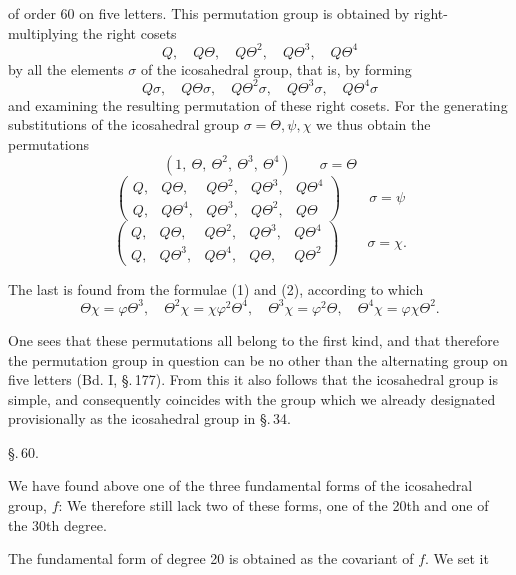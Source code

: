 of order 60 on five letters. This permutation group is obtained by right-multiplying the right cosets
\[
Q, \quad Q\Theta, \quad Q\Theta^2, \quad Q\Theta^3, \quad Q\Theta^4
\]
by all the elements $\sigma$ of the icosahedral group, that is, by forming
\[
Q\sigma, \quad Q\Theta\sigma, \quad Q\Theta^2\sigma, \quad Q\Theta^3\sigma, \quad Q\Theta^4\sigma
\]
and examining the resulting permutation of these right cosets. For the generating substitutions of the icosahedral group $\sigma = \Theta, \psi, \chi$ we thus obtain the permutations
\[
(1, \ \Theta, \ \Theta^2, \ \Theta^3, \ \Theta^4) \qquad \sigma = \Theta
\]
\[
\begin{pmatrix} Q, & Q\Theta, & Q\Theta^2, & Q\Theta^3, & Q\Theta^4 \\ Q, & Q\Theta^4, & Q\Theta^3, & Q\Theta^2, & Q\Theta \end{pmatrix} \qquad \sigma = \psi
\]
\[
\begin{pmatrix} Q, & Q\Theta, & Q\Theta^2, & Q\Theta^3, & Q\Theta^4 \\ Q, & Q\Theta^3, & Q\Theta^4, & Q\Theta, & Q\Theta^2 \end{pmatrix} \qquad \sigma = \chi.
\]

The last is found from the formulae (1) and (2), according to which
\[
\Theta\chi = \varphi\Theta^3, \quad \Theta^2\chi = \chi\varphi^2\Theta^4, \quad \Theta^3\chi = \varphi^2\Theta, \quad \Theta^4\chi = \varphi\chi\Theta^2.
\]

One sees that these permutations all belong to the first kind, and that therefore the permutation group in question can be no other than the alternating group on five letters (Bd. I, \S.\,177). From this it also follows that the icosahedral group is simple, and consequently coincides with the group which we already designated provisionally as the icosahedral group in \S.\,34.

\begin{center}
\S.\,60.\\[2pt]
\end{center}

We have found above one of the three fundamental forms of the icosahedral group, $f$:
We therefore still lack two of these forms, one of the 20th and one of the 30th degree.

The fundamental form of degree 20 is obtained as the  covariant of $f$. We set it
